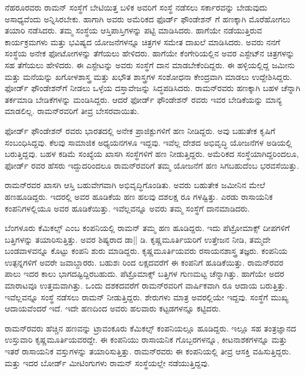 ನೆಹರೂರವರು ರಾಮನ್ ಸಂಸ್ಥೆಗೆ ಬೇಟಿಯಿತ್ತ ಬಳಿಕ ಅವರಿಗೆ ಸಂಸ್ಥೆ ನಡೆಸಲು ಸರ್ಕಾರವನ್ನು ಬೇಡುವುದು ಅಸಾಧ್ಯವೆಂದು ಅನ್ನಿಸಿರಬೇಕು. ಹಾಗಾಗಿ ಅವರು ಅಮೆರಿಕದ ಫೊರ್ಡ್ ಫೌಂಡೇಶನ್ ಗೆ ಹಣಕ್ಕಾಗಿ ಮೊರೆಹೋಗಲು ತಯಾರಿ ನಡೆಸಿದರು. ತಮ್ಮ ಸಂಸ್ಥೆಯ ಆಸ್ತಿಪಾಸ್ತಿಗಳನ್ನು ಪಟ್ಟಿ ಮಾಡಿಸಿದರು. ಹಾಗೆಯೇ ನಡೆಯುತ್ತಿರುವ ಕಾರ್ಯಕ್ರಮಗಳು ಮತ್ತು ಭವಿಷ್ಯದ ಯೋಜನೆಗಳನ್ನೂ ಚಿತ್ರಗಳ ಸಮೇತ ದಾಖಲೆ ಮಾಡಿಸಿದರು. ಅವರು ನನಗೆ ಸಂಸ್ಥೆಯ ಅನೇಕ ಫೋಟೋಗಳನ್ನು ತೆಗೆಯಲು ಹೇಳಿದರು. ಹಾಗೆಯೇ ಕೆಂಗೇರಿಯಲ್ಲಿನ ಅವರ ಎಸ್ಟೇಟ್‍ನ ಚಿತ್ರಗಳನ್ನು ಸಹ ತೆಗೆಯಲು ಹೇಳಿದರು. ಈ ಎಸ್ಟೇಟನ್ನು ಅವರು ಸಂಸ್ಥೆಗೆ ದಾನ ಮಾಡಬೇಕೆಂದಿದ್ದರು. ಈ ಹಳ್ಳಿಯಲ್ಲಿದ್ದ ಜಮೀನು ಮತ್ತು ಮನೆಯನ್ನು ಖಗೋಳಶಾಸ್ತ್ರ ಮತ್ತು ಖಭೌತ ಶಾಸ್ತ್ರಗಳ ಸಂಶೋಧನಾ ಕೇಂದ್ರವಾಗಿ ಮಾಡಲು ಉದ್ದೇಶಿಸಿದ್ದರು. ಫೋರ್ಡ್ ಫೌಂಡೇಶನ್‍ಗೆ ನೀಡಲು ಒಳ್ಳೆಯ ದಸ್ತಾವೇಜನ್ನು ಸಿದ್ಧಪಡಿಸಿದರು. ರಾಮನ್‍ರವರು ಹಣಕ್ಕಾಗಿ ಬಹಳ ಚೆನ್ನಾಗಿ ತರ್ಕಮಾಡಿ ಬೇಡಿಕೆಗಳನ್ನು ಮಂಡಿಸಿದ್ದರು. ಆದರೆ ಫೋರ್ಡ್ ಫೌಂಡೇಶನ್ ರವರು ಇವರ ಬೇಡಿಕೆಯನ್ನು ಮಾನ್ಯ ಮಾಡಲಿಲ್ಲ. ರಾಮನ್‍ರವರಿಗೆ ತೀವ್ರ ಬೇಸರವಾಯಿತು.

ಫೋರ್ಡ್ ಫೌಂಡೇಶನ್ ರವರು ಭಾರತದಲ್ಲಿ ಅನೇಕ ಪ್ರಾಜಿಕ್ಟುಗಳಿಗೆ ಹಣ ನೀಡಿದ್ದರು. ಅವು ಬಹುತೇಕ ಕೃಷಿಗೆ ಸಂಬಂಧಿಸಿದ್ದವು. ಕೆಲವು ಸಾಮಾಜಿಕ ಅಧ್ಯಯನಗಳೂ ಇದ್ದವು. ಇವೆಲ್ಲ ದೇಶದ ಅಭಿವೃದ್ಧಿ ಯೋಜನೆಗಳ ಅಡಿಯಲ್ಲಿ ಬರುತ್ತಿದ್ದವು. ಬಹಳ ಕಡಿಮೆ ಸಂಖ್ಯೆಯ ಖಾಸಗಿ ಸಂಸ್ಥೆಗಳಿಗೆ ಹಣ ನೀಡುತ್ತಿದ್ದರು. ಅಮೆರಿಕದ ಸಂಸ್ಥೆಯಾಗಿದ್ದರಿಂದಲೂ, ಫೋರ್ಡ್ ರವರ ಹೆಸರು ಇದ್ದುದರಿಂದಲೂ ರಾಮನ್‍ರವರಿಗೆ ತಮ್ಮ ಯೋಜನೆಗೆ ಹಣ ಸಿಗಬಹುದೆಂಬ ಭರವಸೆಯಿತ್ತು.

ರಾಮನ್‍ರವರ ಖಾಸಗಿ ಆಸ್ತಿ ಬಹುವೇಗವಾಗಿ ಅಭಿವೃದ್ಧಿಗೊಂಡಿತು. ಅವರು ಬಹುತೇಕ ಜಮೀನಿನ ಮೇಲೆ ಹಣಹೂಡಿದ್ದರು. ಇದರಲ್ಲಿ ಅವರ ಹೂಡಿಕೆಯ ಹಣ ಹಲವು ದಶಲಕ್ಷ ರೂ ಗಳಷ್ಟಿತ್ತು. ಎರಡು ರಾಸಾಯನಿಕ ಕಂಪನಿಗಳಲ್ಲಿಯೂ ಅವರ ಹೂಡಿಕೆಯಿತ್ತು. ಇವೆಲ್ಲವನ್ನೂ ಅವರು ತಮ್ಮ ಸಂಸ್ಥೆಗೆ ದಾನಮಾಡಿದರು.

ಬೆಂಗಳೂರು ಕೆಮಿಕಲ್ಸ್ ಎಂಬ ಕಂಪನಿಯಲ್ಲಿ ರಾಮನ್ ತಮ್ಮ ಹಣ ಹೂಡಿದ್ದರು. ಇದು ಪೆಟ್ರೋಮಾಕ್ಸ್ ದೀಪಗಳಿಗೆ ಬತ್ತಿಗಳನ್ನು ತಯಾರಿಸುತ್ತಿತ್ತು. ಅವರ ಶಿಷ್ಯರಾದ ಡಾ|| ಡಿ. ಕೃಷ್ಣಮೂರ್ತಿಯರಿಗೆ ಉತ್ತೇಜನ ನೀಡಿ, ತಮ್ಮದೇ ಬಂಡವಾಳವನ್ನೂ ಕೊಟ್ಟು ಕಂಪನಿ ಶುರು ಮಾಡಿದ್ದರು. ಕೃಷ್ಣಮೂರ್ತಿಯವರು ರಸಾಯನಶಾಸ್ತ್ರ ತಜ್ಞರು. ಕಂಪನಿಯ ಉತ್ಪನ್ನಗಳಿಗೆ ಅವರೇ ಜವಾಬ್ದಾರರು. ಬಹುಶಃ  ರಿಂದ  ಲಕ್ಷದವರೆಗೆ ಈ ಕಂಪನಿಗೆ ಹೂಡಿಕೆಯಿತ್ತು. ರಾಮನ್‍ರವರ ಪಾಲು ಇದರ ಕಾಲು ಭಾಗದಷ್ಟಿದ್ದಿರಬಹುದು. ಪೆಟ್ರೊಮಾಕ್ಸ್ ಬತ್ತಿಗಳ ಗುಣಮಟ್ಟ ಚೆನ್ನಾಗಿತ್ತು. ಹಾಗೆಯೇ ಅದರ ಮಾರಾಟವೂ ಉತ್ತಮವಾಗಿತ್ತು. ಒಂದು ದಶಕದವರೆಗೆ ರಾಮನ್‍ರವರಿಗೆ ವಾರ್ಷಿಕವಾಗಿ  ರೂ ಆದಾಯ ಬರುತ್ತಿತ್ತು. ಇವೆಲ್ಲವನ್ನೂ ಸಂಸ್ಥೆ ನಡೆಸಲು ರಾಮನ್ ನೀಡುತ್ತಿದ್ದರು. ಶೇರುಗಳು ಮಾತ್ರ ಅವರಲ್ಲಿಯೇ ಇದ್ದವು. ಸಂಸ್ಥೆಗೆ ಮುಖ್ಯ ಆದಾಯವೆಂದರೆ ಇದೆ. ಇದೇ ಹಣದಿಂದ ಅವರು ಹಲವಾರು ಕಟ್ಟಡಗಳನ್ನೂ ಕಟ್ಟಿದರು.

ರಾಮನ್‍ರವರು ಹೆಚ್ಚಿನ ಹಣವನ್ನು ಟ್ರಾವಂಕೂರು ಕೆಮಿಕಲ್ಸ್ ಕಂಪನಿಯಲ್ಲೂ ಹೂಡಿದ್ದರು. ಇಲ್ಲೂ ಸಹ ತಂತ್ರಜ್ಞಾನದ ಉಸ್ತುವಾರಿ ಕೃಷ್ಣಮೂರ್ತಿಯವರದ್ದೇ. ಈ ಕಂಪನಿಯು ರಾಸಾಯನಿಕ ಗೊಬ್ಬರಗಳನ್ನೂ, ಕೀಟನಾಶಕಗಳನ್ನೂ ಮತ್ತು ಇತರೆ ರಾಸಾಯನಿಕ ವಸ್ತುಗಳನ್ನು ತಯಾರಿಸುತ್ತಿತ್ತು. ರಾಮನ್‍ರವರು ಈ ಕಂಪನಿಯಲ್ಲಿ ತೀವ್ರ ಆಸಕ್ತಿ ವಹಿಸುತ್ತಿದ್ದರು. ಮತ್ತು ಇದರ ಬೋರ್ಡ್ ಮೀಟಿಂಗುಗಳು ರಾಮನ್ ಸಂಸ್ಥೆಯಲ್ಲೇ ನಡೆಯುತ್ತಿದ್ದವು.


